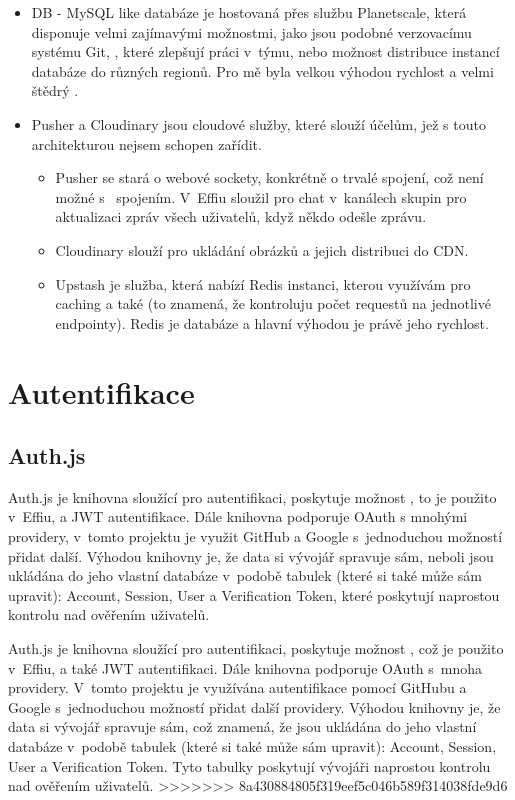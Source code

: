 \documentclass[12pt, a4paper,
openright
]{report}
\begin{document}
\begin{itemize}
		\item DB - MySQL like databáze je hostovaná přes službu Planetscale, která disponuje velmi zajímavými možnostmi, jako jsou  podobné verzovacímu systému Git, , které zlepšují práci v~týmu, nebo možnost distribuce  instancí databáze do různých regionů. Pro mě byla velkou výhodou rychlost a velmi štědrý .
		\item Pusher a Cloudinary jsou cloudové služby, které slouží účelům, jež s touto architekturou nejsem schopen zařídit.
		
		\begin{itemize}
			\item Pusher se stará o webové sockety, konkrétně o trvalé spojení, což není možné s~ spojením. V~Effiu sloužil pro chat v~kanálech skupin pro aktualizaci zpráv všech uživatelů, když někdo odešle zprávu.
			
			\item Cloudinary slouží pro ukládání obrázků a jejich distribuci do CDN.
			
			\item Upstash je služba, která nabízí Redis instanci, kterou využívám pro caching a také  (to znamená, že kontroluju počet requestů na jednotlivé endpointy). Redis je  databáze a hlavní výhodou je právě jeho rychlost.
		\end{itemize}
	\end{itemize}


\section{Autentifikace}
\subsection{Auth.js}

Auth.js je knihovna sloužící pro autentifikaci, poskytuje možnost , to je použito v~Effiu, a JWT autentifikace. Dále knihovna podporuje OAuth s mnohými providery, v~tomto projektu je využit GitHub a Google s~jednoduchou možností přidat další. Výhodou knihovny je, že data si vývojář spravuje sám, neboli jsou ukládána do jeho vlastní databáze v~podobě tabulek (které si také může sám upravit): Account, Session, User a Verification Token, které poskytují naprostou kontrolu nad ověřením uživatelů.

Auth.js je knihovna sloužící pro autentifikaci, poskytuje možnost , což je použito v~Effiu, a také JWT autentifikaci. Dále knihovna podporuje OAuth s~mnoha providery. V~tomto projektu je využívána autentifikace pomocí GitHubu a Google s~jednoduchou možností přidat další providery. Výhodou knihovny je, že data si vývojář spravuje sám, což znamená, že jsou ukládána do jeho vlastní databáze v~podobě tabulek (které si také může sám upravit): Account, Session, User a Verification Token. Tyto tabulky poskytují vývojáři naprostou kontrolu nad ověřením uživatelů.
\clearpage
>>>>>>> 8a430884805f319eef5c046b589f314038fde9d6
\end{document}
